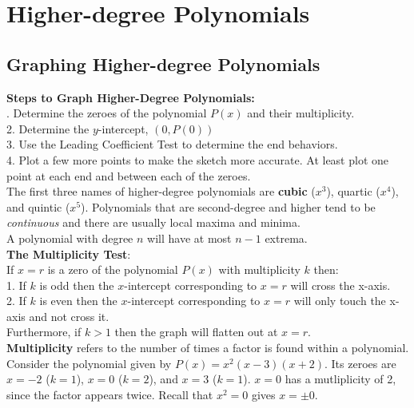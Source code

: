 \section{Higher-degree Polynomials}

    \subsection{Graphing Higher-degree Polynomials}
        \color{purple} \textbf{Steps to Graph Higher-Degree Polynomials:} \color{black} \\

        . Determine the zeroes of the polynomial $P(x)$ and their multiplicity. \\
        2. Determine the $y$-intercept, $(0, P(0))$ \\
        3. Use the Leading Coefficient Test to determine the end behaviors. \\
        4. Plot a few more points to make the sketch more accurate.
        At least plot one point at each end and between each of the zeroes. \\

        \noindent The first three names of higher-degree polynomials are \textbf{cubic} ($x^3$),
        quartic ($x^4$), and quintic ($x^5$). Polynomials that are second-degree and higher
        tend to be \textit{continuous} and there are usually local maxima and minima. \\

        \noindent A polynomial with degree $n$ will have at most $n-1$ extrema. \\

        \noindent \color{purple} \textbf{The Multiplicity Test}: \\

        \noindent \color{black}
        If $x=r$ is a zero of the polynomial $P(x)$ with multiplicity $k$ then:  \\
        1. If $k$ is odd then the $x$-intercept corresponding to $x=r$ will cross the x-axis. \\
        2. If $k$ is even then the $x$-intercept corresponding to $x=r$ will only touch the
        x-axis and not cross it. \\

        \noindent Furthermore, if $k>1$ then the graph will flatten out at $x=r$. \\

        \noindent \color{purple} \textbf{Multiplicity} \color{black} refers to the number of
        times a factor is found within a polynomial. Consider the polynomial given by
        $P(x)=x^2(x-3)(x+2)$. Its zeroes are $x=-2$ ($k=1$), $x=0$ ($k=2$), and
        $x=3$ ($k=1$). $x=0$ has a mutliplicity of 2, since the factor appears twice.
        Recall that $x^2=0$ gives $x=\pm 0$. \\

